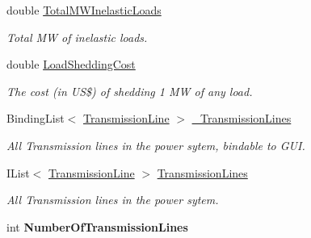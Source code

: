 \begin{DoxyCompactItemize}
\item 
double \hyperlink{class_power_system_planning_1_1_power_system_ade5099d2eb198a61bf794e14ce4b3018}{Total\+M\+W\+Inelastic\+Loads}
\begin{DoxyCompactList}\small\item\em Total MW of inelastic loads. \end{DoxyCompactList}\item 
double \hyperlink{class_power_system_planning_1_1_power_system_a3f0729d4eaa155e4b8be848d84a1fbff}{Load\+Shedding\+Cost}
\begin{DoxyCompactList}\small\item\em The cost (in US\$) of shedding 1 MW of any load. \end{DoxyCompactList}\item 
Binding\+List$<$ \hyperlink{class_power_system_planning_1_1_transmission_line}{Transmission\+Line} $>$ \hyperlink{class_power_system_planning_1_1_power_system_a88e97e6852c0105b86408ff9753163ba}{\+\_\+\+Transmission\+Lines}
\begin{DoxyCompactList}\small\item\em All Transmission lines in the power sytem, bindable to G\+UI. \end{DoxyCompactList}\item 
I\+List$<$ \hyperlink{class_power_system_planning_1_1_transmission_line}{Transmission\+Line} $>$ \hyperlink{class_power_system_planning_1_1_power_system_a8b2c36218174e515b9ab0ef34531435f}{Transmission\+Lines}
\begin{DoxyCompactList}\small\item\em All Transmission lines in the power sytem. \end{DoxyCompactList}\item 
int {\bfseries Number\+Of\+Transmission\+Lines}\hypertarget{class_power_system_planning_1_1_power_system_aec138fa5496014f03d2511d62f19ce1f}{}\label{class_power_system_planning_1_1_power_system_aec138fa5496014f03d2511d62f19ce1f}


\end{DoxyCompactItemize}
